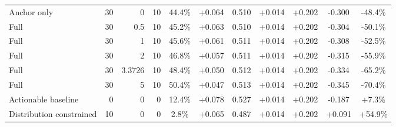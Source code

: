 \begin{table}[htbp]
\begin{tabular}{lrrrccccccc}
Anchor only & 30 & 0 & 10 & 44.4\% & +0.064 & 0.510 & +0.014 & +0.202 & -0.300 & -48.4\% \\
Full & 30 & 0.5 & 10 & 45.2\% & +0.063 & 0.510 & +0.014 & +0.202 & -0.304 & -50.1\% \\
Full & 30 & 1 & 10 & 45.6\% & +0.061 & 0.511 & +0.014 & +0.202 & -0.308 & -52.5\% \\
Full & 30 & 2 & 10 & 46.8\% & +0.057 & 0.511 & +0.014 & +0.202 & -0.315 & -55.9\% \\
Full & 30 & 3.3726 & 10 & 48.4\% & +0.050 & 0.512 & +0.014 & +0.202 & -0.334 & -65.2\% \\
Full & 30 & 5 & 10 & 50.4\% & +0.047 & 0.513 & +0.014 & +0.202 & -0.345 & -70.4\% \\
Actionable baseline & 0 & 0 & 0 & 12.4\% & +0.078 & 0.527 & +0.014 & +0.202 & -0.187 & +7.3\% \\
Distribution constrained & 10 & 0 & 0 & 2.8\% & +0.065 & 0.487 & +0.014 & +0.202 & +0.091 & +54.9\% \\
\bottomrule
\end{tabular}
\end{table}